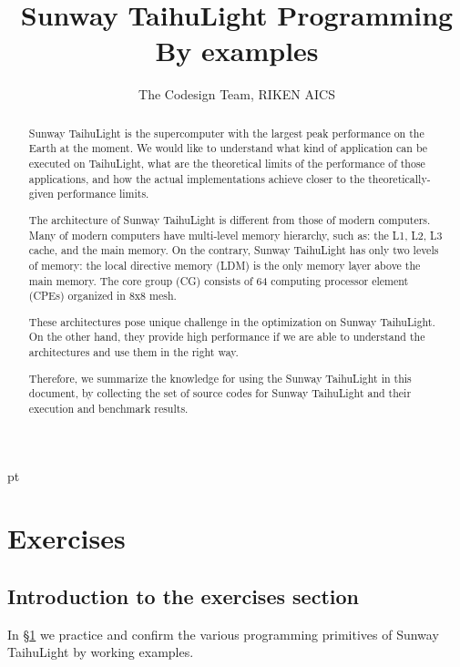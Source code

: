\documentclass{article}
\begin{document}
\parindent 0pt
 pt
\title{Sunway TaihuLight Programming By examples}
\author{The Codesign Team, RIKEN AICS}
\maketitle
\thispagestyle{empty}

\begin{abstract}
  Sunway TaihuLight is the supercomputer with the largest peak performance on the Earth
  at the moment.
  We would like to understand what kind of application can be executed on TaihuLight,
  what are the theoretical limits of the performance of those applications,
  and how the actual implementations achieve closer to the theoretically-given performance limits.

  The architecture of Sunway TaihuLight is different from those of
  modern computers.  Many of modern computers have multi-level memory
  hierarchy, such as: the L1, L2, L3 cache, and the main memory. On
  the contrary, Sunway TaihuLight has only two levels of memory: the
  local directive memory (LDM) is the only memory layer above the main
  memory. The core group (CG) consists of 64 computing processor
  element (CPEs) organized in 8x8 mesh.

  These architectures pose unique challenge in the optimization on
  Sunway TaihuLight. On the other hand, they provide high performance
  if we are able to understand the architectures and use them in the
  right way.

  Therefore, we summarize the knowledge for using the Sunway TaihuLight in this document,
  by collecting the set of source codes
  for Sunway TaihuLight
  and their execution and benchmark results.


\end{abstract}

\newpage\tableofcontents\newpage

\section{Exercises} \label{sec:exercises}

\subsection{Introduction to the exercises section}


In \S \ref{sec:exercises} we practice and confirm the various programming primitives of Sunway TaihuLight
by working examples.
\end{document}
